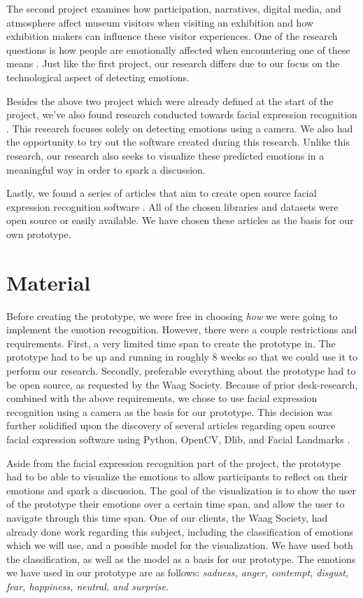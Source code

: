 \documentclass[sigconf]{acmart}
\begin{document}
The second project examines how participation, narratives, digital media, and atmosphere affect museum
visitors when visiting an exhibition and how exhibition makers can influence these visitor experiences.
One of the research questions is how people are emotionally affected when encountering one of
these means \cite{}. Just like the first project, our research differs due to our focus on the technological
aspect of detecting emotions.

Besides the above two project which were already defined at the start of the project, we've also found research
conducted towards facial expression recognition \cite{den2005facereader}. This research focuses solely on
detecting emotions using a camera. We also had the opportunity to try out the software created during this
research. Unlike this research, our research also seeks to visualize these predicted emotions in a meaningful
way in order to spark a discussion.

Lastly, we found a series of articles that aim to create open source facial expression recognition software
\cite{gent2016landmarks}. All of the chosen libraries and datasets were open source or easily available.
We have chosen these articles as the basis for our own prototype.


\section{Material}
Before creating the prototype, we were free in choosing \emph{how} we were going to implement the emotion
recognition. However, there were a couple restrictions and requirements. First, a very limited time span
to create the prototype in. The prototype had to be up and running in roughly 8 weeks so that we could
use it to perform our research. Secondly, preferable everything about the prototype had to be open source, as
requested by the Waag Society. Because of prior desk-research, combined with the above requirements, we
chose to use facial expression recognition using a camera as the basis for our prototype. This decision was
further solidified upon the discovery of several articles regarding open source facial expression software
using Python, OpenCV, Dlib, and Facial Landmarks \cite{gent2016landmarks}.

Aside from the facial expression recognition part of the project, the prototype had to be able to visualize the
emotions to allow participants to reflect on their emotions and spark a discussion. The goal of the
visualization is to show the user of the prototype their emotions over a certain time span, and allow the user
to navigate through this time span. One of our clients, the Waag Society, had already done work regarding
this subject, including the classification of emotions \cite{plutchik1980general} which we will use,
and a possible model for the visualization. We have used both the classification, as well as the model
as a basis for our prototype. The emotions we have used in our prototype are as follows: \emph{sadness,
anger, contempt, disgust, fear, happiness, neutral, and surprise}.
\end{document}
